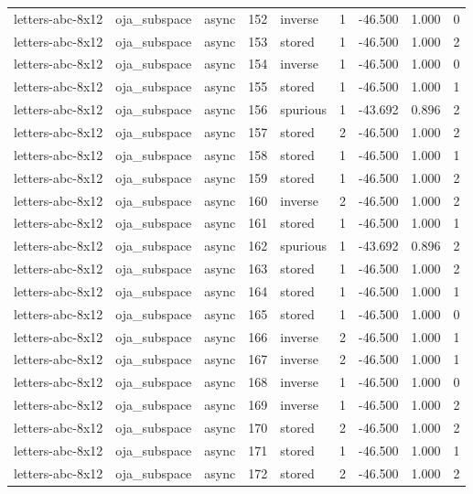\begin{tabular}{lllrlrrrr}
letters-abc-8x12 & oja\_subspace & async & 152 & inverse & 1 & -46.500 & 1.000 & 0 \\
letters-abc-8x12 & oja\_subspace & async & 153 & stored & 1 & -46.500 & 1.000 & 2 \\
letters-abc-8x12 & oja\_subspace & async & 154 & inverse & 1 & -46.500 & 1.000 & 0 \\
letters-abc-8x12 & oja\_subspace & async & 155 & stored & 1 & -46.500 & 1.000 & 1 \\
letters-abc-8x12 & oja\_subspace & async & 156 & spurious & 1 & -43.692 & 0.896 & 2 \\
letters-abc-8x12 & oja\_subspace & async & 157 & stored & 2 & -46.500 & 1.000 & 2 \\
letters-abc-8x12 & oja\_subspace & async & 158 & stored & 1 & -46.500 & 1.000 & 1 \\
letters-abc-8x12 & oja\_subspace & async & 159 & stored & 1 & -46.500 & 1.000 & 2 \\
letters-abc-8x12 & oja\_subspace & async & 160 & inverse & 2 & -46.500 & 1.000 & 2 \\
letters-abc-8x12 & oja\_subspace & async & 161 & stored & 1 & -46.500 & 1.000 & 1 \\
letters-abc-8x12 & oja\_subspace & async & 162 & spurious & 1 & -43.692 & 0.896 & 2 \\
letters-abc-8x12 & oja\_subspace & async & 163 & stored & 1 & -46.500 & 1.000 & 2 \\
letters-abc-8x12 & oja\_subspace & async & 164 & stored & 1 & -46.500 & 1.000 & 1 \\
letters-abc-8x12 & oja\_subspace & async & 165 & stored & 1 & -46.500 & 1.000 & 0 \\
letters-abc-8x12 & oja\_subspace & async & 166 & inverse & 2 & -46.500 & 1.000 & 1 \\
letters-abc-8x12 & oja\_subspace & async & 167 & inverse & 2 & -46.500 & 1.000 & 1 \\
letters-abc-8x12 & oja\_subspace & async & 168 & inverse & 1 & -46.500 & 1.000 & 0 \\
letters-abc-8x12 & oja\_subspace & async & 169 & inverse & 1 & -46.500 & 1.000 & 2 \\
letters-abc-8x12 & oja\_subspace & async & 170 & stored & 2 & -46.500 & 1.000 & 2 \\
letters-abc-8x12 & oja\_subspace & async & 171 & stored & 1 & -46.500 & 1.000 & 1 \\
letters-abc-8x12 & oja\_subspace & async & 172 & stored & 2 & -46.500 & 1.000 & 2 \\

\end{tabular}
